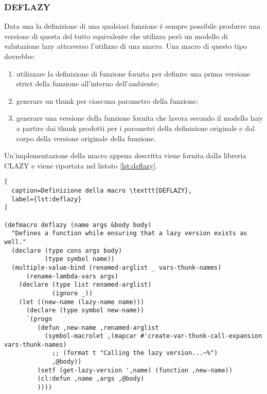 \subsubsection{DEFLAZY}

Data una la definizione di una qualsiasi funzione è sempre possibile produrre una versione di questa del tutto equivalente che utilizza però un modello di valutazione lazy attraverso l'utilizzo di una macro. Una macro di questo tipo dovrebbe:

\begin{enumerate}

\item utilizzare la definizione di funzione fornita per definire una prima versione strict della funzione all'interno dell'ambiente;

\item generare un thunk per ciascuna parametro della funzione;

\item generare una versione della funzione fornita che lavora secondo il modello lazy a partire dai thunk prodotti per i parametri della definizione originale e dal corpo della versione originale della funzione.

\end{enumerate}

Un'implementazione della macro appena descritta viene fornita dalla libreria CLAZY \cite{} e viene riportata nel listato \ref{lst:deflazy}.

\begin{lstlisting}[
  caption=Definizione della macro \texttt{DEFLAZY},
  label={lst:deflazy}
]

(defmacro deflazy (name args &body body)
  "Defines a function while ensuring that a lazy version exists as well."
  (declare (type cons args body)
           (type symbol name))
  (multiple-value-bind (renamed-arglist _ vars-thunk-names)
      (rename-lambda-vars args)
    (declare (type list renamed-arglist)
             (ignore _))
    (let ((new-name (lazy-name name)))
      (declare (type symbol new-name))
      `(progn
         (defun ,new-name ,renamed-arglist
           (symbol-macrolet ,(mapcar #'create-var-thunk-call-expansion vars-thunk-names)
             ;; (format t "Calling the lazy version...~%")
             ,@body))
         (setf (get-lazy-version ',name) (function ,new-name))
         (cl:defun ,name ,args ,@body)
         ))))

\end{lstlisting}

